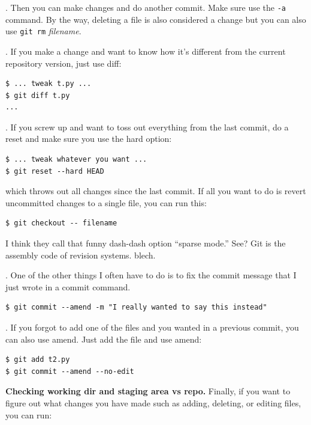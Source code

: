 . Then you can make changes and do another commit. Make sure use the {\tt -a} command. By the way, deleting a file is also considered a change but you can also use {\tt git rm} {\em filename}.

. If you make a change and want to know how it's different from the current repository version, just use diff:

\begin{lstlisting}[style=BashInputStyle]
$ ... tweak t.py ...
$ git diff t.py
...
\end{lstlisting}

. If you screw up and want to toss out everything from the last commit, do a reset and make sure you use the hard option:

\begin{lstlisting}[style=BashInputStyle]
$ ... tweak whatever you want ...
$ git reset --hard HEAD
\end{lstlisting}

\noindent which throws out all changes since the last commit. If all you want to do is revert uncommitted changes to a single file, you can run this:

\begin{lstlisting}[style=BashInputStyle]
$ git checkout -- filename
\end{lstlisting}

I think they call that funny dash-dash option ``sparse mode.'' See? Git is the assembly code of revision systems. blech.

. One of the other things I often have to do is to fix the commit message that I just wrote in a commit command.

\begin{lstlisting}[style=BashInputStyle]
$ git commit --amend -m "I really wanted to say this instead"
\end{lstlisting}

. If you forgot to add one of the files and you wanted in a previous commit, you can also use amend. Just add the file and use amend:

\begin{lstlisting}[style=BashInputStyle]
$ git add t2.py
$ git commit --amend --no-edit
\end{lstlisting}

{\bf Checking working dir and staging area vs repo.} Finally, if you want to figure out what changes you have made such as adding, deleting, or editing files, you can run:

